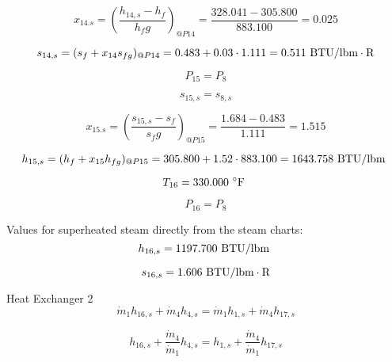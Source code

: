 \documentclass{article}
\begin{document}
\begin{equation}
x_{14.s} = (\frac{h_{14,s} - h_{f}}{h_fg})_{@P14} = \frac{ 328.041 -  305.800}{ 883.100} =    0.025
\end{equation}

\begin{equation}
  s_{14,s} = (s_{f} + x_{14}s_{fg})_{@P14} =    0.483 + 0.03\cdot   1.111 =    0.511
\textnormal{ BTU/lbm}\cdot\textnormal{R}
\end{equation}

\begin{equation}
P_{15} = P_{ 8}
\end{equation}

\begin{equation}
s_{15,s} = s_{ 8,s}
\end{equation}

\begin{equation}
x_{15.s} = (\frac{s_{15,s} - s_{f}}{s_fg})_{@P15} = \frac{   1.684 -    0.483}{   1.111} =    1.515
\end{equation}

\begin{equation}
  h_{15,s} = (h_{f} + x_{15}h_{fg})_{@P15} =  305.800 + 1.52\cdot 883.100 = 1643.758
\textnormal{ BTU/lbm                   }
\end{equation}

\begin{equation}
T_{16} =  330.000\textnormal{ \(^{\circ}\)F             }
\end{equation}

\begin{equation}
P_{16} = P_{ 8}
\end{equation}

Values for superheated steam directly from the steam charts:
\begin{equation}
  h_{16,s} = 1197.700\textnormal{ BTU/lbm                   }
\end{equation}

\begin{equation}
  s_{16,s} =    1.606\textnormal{ BTU/lbm}\cdot\textnormal{R}
\end{equation}


Heat Exchanger 2
\begin{equation}
\dot{m}_{ 1}h_{16,s} + \dot{m}_{ 4}h_{ 4,s} = \dot{m}_{ 1}h_{ 1,s} + \dot{m}_{ 4}h_{17,s}
\end{equation}

\begin{equation}
h_{16,s} + \frac{\dot{m}_{ 4}}{\dot{m}_{ 1}}h_{ 4,s} = h_{ 1,s} + \frac{\dot{m}_{ 4}}{\dot{m}_{ 1}}h_{17,s}
\end{equation}
\end{document}
